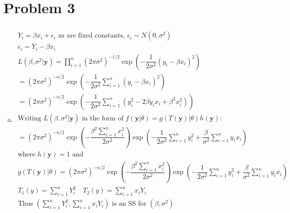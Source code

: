 \documentclass{article}
\newcommand{\B}{\beta}
\newcommand{\sumn}{\sum_{i=1}^{n}}
\newcommand{\prodn}{\prod_{i=1}^{n}}
\begin{document}
\begin{flushleft}
\begin{enumerate}[(a)]
\end{enumerate}

	\section*{Problem 3}
	
\begin{enumerate}[(a)]
	\item 
\begin{multline*}\\
Y_i=\B x_i+\epsilon_i \text{ xs are fixed constants, } \epsilon_i\sim N(0,\sigma^2)\\
\epsilon_i=Y_i-\B x_i\\
L(\B,\sigma^2|\bm{y})=\prodn (2\pi\sigma^2)^{-1/2}\exp\left(-\dfrac{1}{2\sigma^2}(y_i-\B x_i)^2\right)\\
=(2\pi\sigma^2)^{-n/2}\exp\left(-\dfrac{1}{2\sigma^2}\sumn(y_i-\B x_i)^2\right)\\
=(2\pi\sigma^2)^{-n/2}\exp\left(-\dfrac{1}{2\sigma^2}\sumn(y_i^2-2\B y_ix_i+\B^2x_i^2)\right)\\
\text{Writing } L(\B,\sigma^2|\bm{y}) \text{ in the form of }f(\bm{y}|\theta)=g(T(\bm{y})|\theta)h(\bm{y}):\\
=(2\pi\sigma^2)^{-n/2}\exp\left(-\dfrac{\B^2\sumn x_i^2}{2\sigma^2}\right)\exp\left(-\dfrac{1}{2\sigma^2}\sumn y_i^2 +\dfrac{\B}{\sigma^2}\sumn y_ix_i\right)\\
\text{where } h(\bm{y})=1 \text { and}\\ g(T(\bm{y})|\theta)=(2\pi\sigma^2)^{-n/2}\exp\left(-\dfrac{\B^2\sumn x_i^2}{2\sigma^2}\right)\exp\left(-\dfrac{1}{2\sigma^2}\sumn y_i^2 +\dfrac{\B}{\sigma^2}\sumn y_ix_i\right)\\
T_1(y)=\sumn Y_i^2 \quad T_2(y)=\sumn x_iY_i\\
\text{Thus } (\sumn Y_i^2,\sumn x_iY_i) \text{ is an SS for } (\B,\sigma^2)\\
\end{multline*}
	

\end{enumerate}
\end{flushleft}
\end{document}
